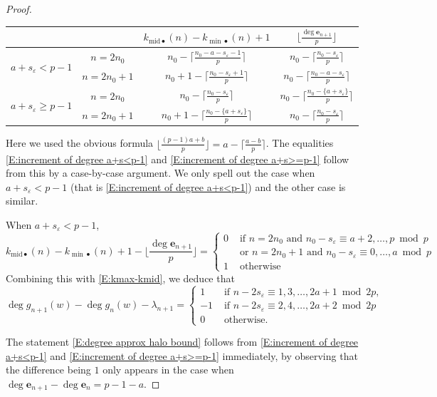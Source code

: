 \documentclass[12pt]{amsart}
\theoremstyle{definition}
\numberwithin{equation}{subsection}
\def\bfe{\mathbf{e}}
\newcommand{\midd}{\mathrm{mid}}
\begin{document}
\begin{proof}
\begin{center}
\begin{tabular}{|c|c|c|c|}
\hline
 & &$k_{\midd \bullet}(n)-k_{{\min} \bullet}(n)+1$ & $\lfloor\frac{\deg \bfe_{n+1}}p\rfloor$ 
\\
\hline
\multirow{2}{*}{$a+s_\varepsilon < p-1$} & $n=2n_0$ &  $n_0-\lceil \frac{n_0-a-s_\varepsilon-1}{p}\rceil$ & $n_0-\lceil \frac{n_0-s_\varepsilon}p\rceil$
\\
\cline{2-4}
& $n=2n_0+1$ & $n_0+1-\lceil\frac{n_0-s_\varepsilon+1}{p}\rceil$ &$n_0-\lceil \frac{n_0-a-s_\varepsilon}p\rceil$
\\
\hline 
\multirow{2}{*}{
$a+s_\varepsilon \geq p-1$} & $n=2n_0$ & $n_0-\lceil \frac{n_0-s_\varepsilon}{p} \rceil$  &  $n_0-\lceil \frac{n_0-\{a+s_\varepsilon\}}p\rceil$
\\
\cline{2-4} & $n=2n_0+1$ & $ n_0+1-\lceil \frac{n_0-\{a+s_\varepsilon\}}{p} \rceil$& $n_0-\lceil \frac{n_0-s_\varepsilon}p\rceil$
\\
\hline
\end{tabular}
\end{center}
Here we used the obvious formula $\lfloor \frac{(p-1)a+b}p\rfloor = a - \lceil \frac{a-b}p\rceil$. 
The equalities \eqref{E:increment of degree a+s<p-1} and \eqref{E:increment of degree a+s>=p-1} follow from this by a case-by-case argument. We only spell out the case when $a+s_\varepsilon<p-1$ (that is \eqref{E:increment of degree a+s<p-1}) and the other case is similar.

When $a+s_\varepsilon<p-1$, 
$$
k_{\midd\bullet}(n) - k_{{\min}\bullet}(n)+1 - \Big\lfloor \frac{\deg \bfe_{n+1}}p\Big \rfloor=
\begin{cases}
0 & \textrm{ if } n = 2n_0 \textrm{ and } n_0  -s_\varepsilon \equiv a+2, \dots, p \bmod p\\
& \textrm{ or } n = 2n_0+1 \textrm{ and } n_0 -s_\varepsilon \equiv 0, \dots, a \bmod p\\
1 & \textrm{ otherwise}
\end{cases}
$$ 
Combining this with \eqref{E:kmax-kmid}, we deduce that
$$
\deg g_{n+1}(w) - \deg g_n(w) - \lambda_{n+1} = \begin{cases}
1 & \textrm{ if } n - 2s_\varepsilon \equiv 1, 3, \dots, 2a+1 \bmod {2p},
\\
-1 & \textrm{ if } n- 2s_{\varepsilon} \equiv 2, 4, \dots, 2a+2 \bmod{2p}
\\
0 & \textrm{ otherwise.}
\end{cases}
$$

The statement \eqref{E:degree approx halo bound} follows from \eqref{E:increment of degree a+s<p-1} and \eqref{E:increment of degree a+s>=p-1} immediately, by observing that the difference being $1$ only appears in the case when $\deg \bfe_{n+1}-\deg \bfe_n = p-1-a$.


\end{proof}
\end{document}
